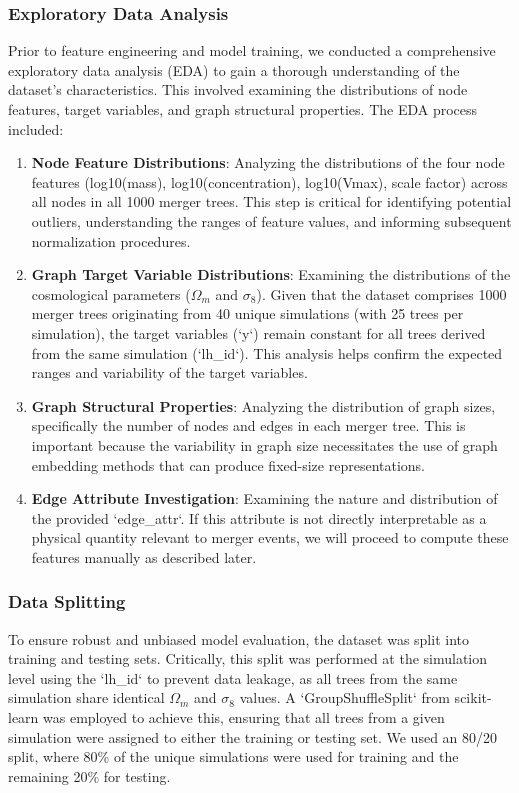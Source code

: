 \documentclass[twocolumn]{aastex631}
\begin{document}
\subsubsection{Exploratory Data Analysis}
Prior to feature engineering and model training, we conducted a comprehensive exploratory data analysis (EDA) to gain a thorough understanding of the dataset's characteristics. This involved examining the distributions of node features, target variables, and graph structural properties. The EDA process included:

\begin{enumerate}
    \item \textbf{Node Feature Distributions}: Analyzing the distributions of the four node features (log10(mass), log10(concentration), log10(Vmax), scale factor) across all nodes in all 1000 merger trees. This step is critical for identifying potential outliers, understanding the ranges of feature values, and informing subsequent normalization procedures.
    \item \textbf{Graph Target Variable Distributions}: Examining the distributions of the cosmological parameters ($\Omega_m$ and $\sigma_8$). Given that the dataset comprises 1000 merger trees originating from 40 unique simulations (with 25 trees per simulation), the target variables (`y`) remain constant for all trees derived from the same simulation (`lh_id`). This analysis helps confirm the expected ranges and variability of the target variables.
    \item \textbf{Graph Structural Properties}: Analyzing the distribution of graph sizes, specifically the number of nodes and edges in each merger tree. This is important because the variability in graph size necessitates the use of graph embedding methods that can produce fixed-size representations.
    \item \textbf{Edge Attribute Investigation}: Examining the nature and distribution of the provided `edge_attr`. If this attribute is not directly interpretable as a physical quantity relevant to merger events, we will proceed to compute these features manually as described later.
\end{enumerate}

\subsubsection{Data Splitting}
To ensure robust and unbiased model evaluation, the dataset was split into training and testing sets. Critically, this split was performed at the simulation level using the `lh_id` to prevent data leakage, as all trees from the same simulation share identical $\Omega_m$ and $\sigma_8$ values. A `GroupShuffleSplit` from scikit-learn was employed to achieve this, ensuring that all trees from a given simulation were assigned to either the training or testing set. We used an 80/20 split, where 80\% of the unique simulations were used for training and the remaining 20\% for testing.
\end{document}
